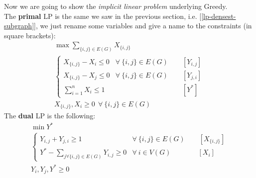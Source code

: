 Now we are going to show the \textit{implicit linear problem} underlying Greedy.\\
The \textbf{primal} LP is the same we saw in the previous section, i.e. [\ref{lp-densest-subgraph}], we just rename some variables and give a name to the constraints (in square brackets):
\begin{equation}\label{lp-greedy-primal}
    \begin{aligned}
        &\max\sum_{\{i, j\} \in E(G)}X_{\{i, j\}}&\\
        &\begin{cases}
            X_{\{i, j\}} - X_i \leq 0 & \forall\ \{i,j\} \in E(G) \quad\quad [Y_{i,j}]\\
            X_{\{i, j\}} - X_j \leq 0 & \forall\ \{i,j\} \in E(G) \quad\quad [Y_{j,i}]\\
            \sum_{i=1}^n X_i \leq 1 & \phantom{\forall\ \{i,j\} \in E(G)} \quad\quad [Y^*]
        \end{cases}&\\
        &X_{\{i, j\}}, X_i \geq 0 \ \ \forall\ \{i,j\} \in E(G)&
    \end{aligned}
\end{equation}
The \textbf{dual} LP is the following:
\begin{equation}\label{lp-greedy-dual}
    \begin{aligned}
        &\min Y^*&\\
        &\begin{cases}
            Y_{i, j} +  Y_{j,i} \geq 1 & \forall\ \{i,j\} \in E(G) \quad\quad [X_{\{i,j\}}]\\
            Y^* - \sum_{j \forall \{i,j\} \in E(G)} Y_{i, j} \geq 0 & \forall\ i \in V(G) \phantom{\{,j\}} \quad\quad [X_i]
        \end{cases}&\\
        &Y_i, Y_j, Y^* \geq 0&
    \end{aligned}
\end{equation}

